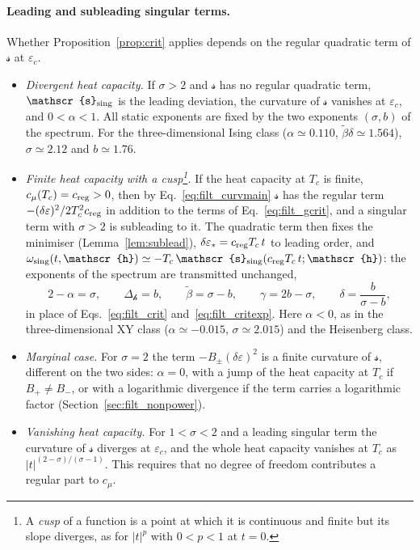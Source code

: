 \documentclass[10pt,a4paper]{article}
\theoremstyle{plain}
\newcommand{\hfield}{\mathscr{h}}  %
\newcommand{\lds}{\mathscr{s}}  %
\begin{document}
\paragraph{Leading and subleading singular terms.} Whether
Proposition~\ref{prop:crit} applies depends on the regular quadratic term of
$\lds$ at $\varepsilon_c$.
\begin{itemize}\setlength{\itemsep}{2pt}
\item \emph{Divergent heat capacity.} If $\sigma>2$ and $\lds$ has no regular
  quadratic term, $\lds_{\rm sing}$ is the leading deviation, the curvature
  of $\lds$ vanishes at $\varepsilon_c$, and $0<\alpha<1$. All static
  exponents are fixed by the two exponents $(\sigma,b)$ of the spectrum. For
  the three-dimensional Ising class ($\alpha\simeq0.110$,
  $\tilde\beta\delta\simeq1.564$), $\sigma\simeq2.12$ and $b\simeq1.76$.
\item \emph{Finite heat capacity with a cusp\footnote{A \emph{cusp} of a
  function is a point at which it is continuous and finite but its slope
  diverges, as for $|t|^{p}$ with $0<p<1$ at $t=0$.}.} If the heat capacity
  at $T_c$ is finite, $c_\mu(T_c)=c_{\rm reg}>0$, then by
  Eq.~\eqref{eq:filt_curvmain} $\lds$ has the regular term $-(\delta\varepsilon)^{2}/2T_c^{2}c_{\rm reg}$ in addition to the terms
  of Eq.~\eqref{eq:filt_gcrit}, and a singular term with $\sigma>2$ is
  subleading to it. The quadratic term then fixes the minimiser
  (Lemma~\ref{lem:sublead}), $\delta\varepsilon_*=c_{\rm reg}T_c\,t$ to
  leading order, and
  $\omega_{\rm sing}(t,\hfield)\simeq-T_c\,\lds_{\rm sing}(c_{\rm reg}T_c\,t;\hfield)$:
  the exponents of the spectrum are transmitted unchanged,
  \begin{equation}\label{eq:filt_critexp2}
    2-\alpha=\sigma ,\qquad \Delta_\hfield=b ,\qquad
    \tilde\beta=\sigma-b ,\qquad \gamma=2b-\sigma ,\qquad
    \delta=\frac{b}{\sigma-b} ,
  \end{equation}
  in place of Eqs.~\eqref{eq:filt_crit} and~\eqref{eq:filt_critexp}. Here
  $\alpha<0$, as in the three-dimensional XY class ($\alpha\simeq-0.015$,
  $\sigma\simeq2.015$) and the Heisenberg class.
\item \emph{Marginal case.} For $\sigma=2$ the term
  $-B_\pm(\delta\varepsilon)^{2}$ is a finite curvature of $\lds$, different
  on the two sides: $\alpha=0$, with a jump of the heat capacity at $T_c$ if
  $B_+\neq B_-$, or with a logarithmic divergence if the term carries a
  logarithmic factor (Section~\ref{sec:filt_nonpower}).
\item \emph{Vanishing heat capacity.} For $1<\sigma<2$ and a leading singular
  term the curvature of $\lds$ diverges at $\varepsilon_c$, and the whole
  heat capacity vanishes at $T_c$ as $|t|^{(2-\sigma)/(\sigma-1)}$. This
  requires that no degree of freedom contributes a regular part to $c_\mu$.
\end{itemize}
\end{document}
